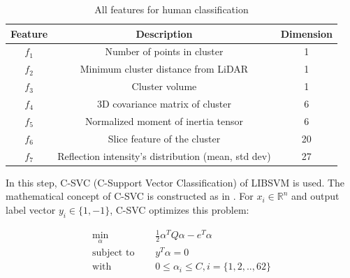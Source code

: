 \begin{table}[h!]
    \centering
    \begin{tabular}{||c|c|c||}
        \hline
        \rowcolor{lightgray}
        \textbf{Feature} & \textbf{Description}                                & \textbf{Dimension} \\ [0.5ex]
        \hline\hline
        $f_1$            & Number of points in cluster                         & 1                  \\
        $f_2$            & Minimum cluster distance from LiDAR                 & 1                  \\
        $f_3$            & Cluster volume                                      & 1                  \\
        $f_4$            & 3D covariance matrix of cluster                     & 6                  \\
        $f_5$            & Normalized moment of inertia tensor                 & 6                  \\
        $f_6$            & Slice feature of the cluster                        & 20                 \\
        $f_7$            & Reflection intensity's distribution (mean, std dev) & 27                 \\ [0.5ex]
        \hline
    \end{tabular}
    \caption{All features for human classification}
    \label{Chap3:Table1}
\end{table}

In this step, C-SVC (C-Support Vector Classification) of LIBSVM is used. The mathematical concept of C-SVC is
constructed as in \cite{libsvm,guide_svm}. For $x_i \in {\mathbb{R}}^{n}$ and output label vector $y_i \in \{ 1,-1 \}$,
C-SVC optimizes this problem:

\begin{equation}
    \label{Chap3:Eq2}
    \begin{split}
        \min_{\alpha}\quad & \frac{1}{2}{\alpha}^{T}Q \alpha - e^T\alpha \\
        \text{subject to } \quad & y^T \alpha = 0 \\
        \text{with } \quad &  0 \leq {\alpha}_i \leq C, i = \{ 1,2,..,62\}
    \end{split}
\end{equation}


